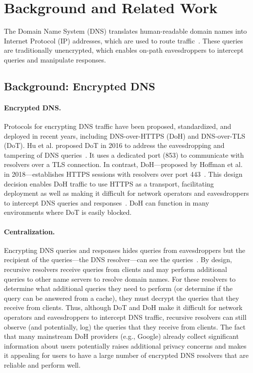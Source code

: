 \section{Background and Related Work}\label{sec:background}

The Domain Name System (DNS) translates human-readable domain names into
Internet Protocol (IP) addresses, which are used to route
traffic~\cite{dns-rfcs}.  These queries are traditionally unencrypted, which
enables on-path eavesdroppers to intercept queries and manipulate responses.
\subsection{Background: Encrypted DNS}

\paragraph{Encrypted DNS.}
Protocols for encrypting DNS traffic have been proposed, standardized, and
deployed in recent years, including DNS-over-HTTPS (DoH) and DNS-over-TLS
(DoT).  Hu et al. proposed DoT in 2016 to address the eavesdropping and
tampering of DNS queries~\cite{hu2016DoT}.  It uses a dedicated port (853)
to communicate with resolvers over a TLS connection.  In contrast,
DoH---proposed by Hoffman et al. in 2018---establishes HTTPS sessions with
resolvers over port 443~\cite{hoffman2018DoH}.  This design decision enables
DoH traffic to use HTTPS as a transport, facilitating deployment as well as
making it difficult for network operators and eavesdroppers to intercept DNS
queries and responses~\cite{boettger2019empirical}. DoH can function in many
environments where DoT is easily blocked.

\paragraph{Centralization.}
Encrypting DNS queries and responses hides queries from eavesdroppers but the
recipient of the queries---the DNS resolver---can see the
queries~\cite{IEEEfight}. By design, recursive resolvers receive queries from
clients and may perform additional queries to other name servers to resolve
domain names.  For these resolvers to determine what additional
queries they need to perform (or determine if the query can be answered from a
cache), they must decrypt the queries that they receive from clients.  Thus,
although DoT and DoH make it difficult for network operators and eavesdroppers
to intercept DNS traffic, recursive resolvers can still
observe (and potentially, log) the queries that they receive from clients.
The fact that many mainstream DoH providers (e.g., Google) already collect
significant information about users potentially raises additional privacy
concerns and makes it appealing for users to have a large number of encrypted
DNS resolvers that are reliable and perform well.

